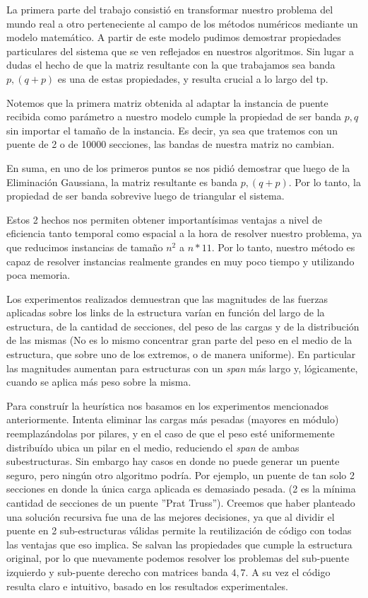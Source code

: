 	La primera parte del trabajo consistió en transformar nuestro problema del mundo real a otro perteneciente al
campo de los métodos numéricos mediante un modelo matemático. A partir de este modelo pudimos demostrar propiedades
particulares del sistema que se ven reflejados en nuestros algoritmos. Sin lugar a dudas el hecho de que la matriz
resultante con la que trabajamos sea banda $p,(q+p)$ es una de estas propiedades, y resulta crucial a lo largo del 
tp.
	
	Notemos que la primera matriz obtenida al adaptar la instancia de puente
recibida como parámetro a nuestro modelo cumple la propiedad de ser banda $p,q$ sin importar el tama\~no de la instancia.
Es decir, ya sea que tratemos con un puente de 2 o de 10000 secciones, las bandas de nuestra matriz no cambian.

	En suma, en uno de los primeros puntos se nos pidió demostrar que luego de la Eliminación Gaussiana, la matriz
resultante es banda $p,(q+p)$. Por lo tanto, la propiedad de ser banda sobrevive luego de triangular el sistema.

	Estos 2 hechos nos permiten obtener importantísimas ventajas a nivel de eficiencia tanto temporal como espacial
a la hora de resolver nuestro problema, ya que reducimos instancias de tama\~no $n^2$ a $n*11$. Por lo tanto, nuestro
método es capaz de resolver instancias realmente grandes en muy poco tiempo y utilizando poca memoria.

	Los experimentos realizados demuestran que las magnitudes de las fuerzas aplicadas sobre los links de la estructura
varían en función del largo de la estructura, de la cantidad de secciones, del peso de las cargas y de la distribución
de las mismas (No es lo mismo concentrar gran parte del peso en el medio de la estructura, que sobre uno de los extremos,
o de manera uniforme). En particular las magnitudes aumentan para estructuras con un \emph{span} más largo y, lógicamente,
cuando se aplica más peso sobre la misma.

	
Para construír la heurística nos basamos en los experimentos mencionados anteriormente. 
Intenta eliminar las cargas más pesadas (mayores en módulo)
reemplazándolas por pilares, y en el caso de que el peso esté uniformemente distribuído ubica un pilar en el medio,
reduciendo el \emph{span} de ambas subestructuras. Sin embargo hay casos en donde no puede generar un puente seguro,
pero ningún otro algoritmo podría. Por ejemplo, un puente de tan solo 2 secciones en donde la única carga aplicada
es demasiado pesada. (2 es la mínima cantidad de secciones de un puente ''Prat Truss'').
Creemos que haber planteado una solución recursiva fue una de las mejores decisiones, ya que al dividir
el puente en 2 sub-estructuras válidas permite la reutilización de código con todas las ventajas que eso implica.
Se salvan las propiedades que cumple la estructura original, por lo que nuevamente podemos resolver los
problemas del sub-puente izquierdo y sub-puente derecho con matrices banda $4,7$.
A su vez el código resulta claro e intuitivo, basado en los resultados experimentales.

